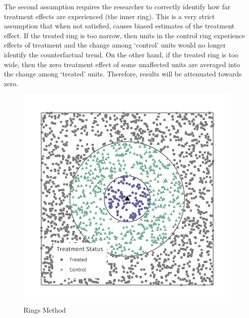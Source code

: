 \documentclass[10pt]{article}
\begin{document}
The second assumption requires the researcher to correctly identify how far treatment effects are experienced (the inner ring). This is a very strict assumption that when not satisfied, causes biased estimates of the treatment effect. If the treated ring is too narrow, then units in the control ring experience effects of treatment and the change among `control' units would no longer identify the counterfactual trend. On the other hand, if the treated ring is too wide, then the zero treatment effect of some unaffected units are averaged into the change among `treated' units. Therefore, results will be attenuated towards zero.



\begin{figure}[tb]
    \caption{Rings Method}
    \label{fig:example-id}

    \begin{adjustbox}{width = 0.4\textwidth, center}
        \includegraphics[width=\textwidth]{../../figures/example_id.pdf}
    \end{adjustbox}
\end{figure}
\end{document}
